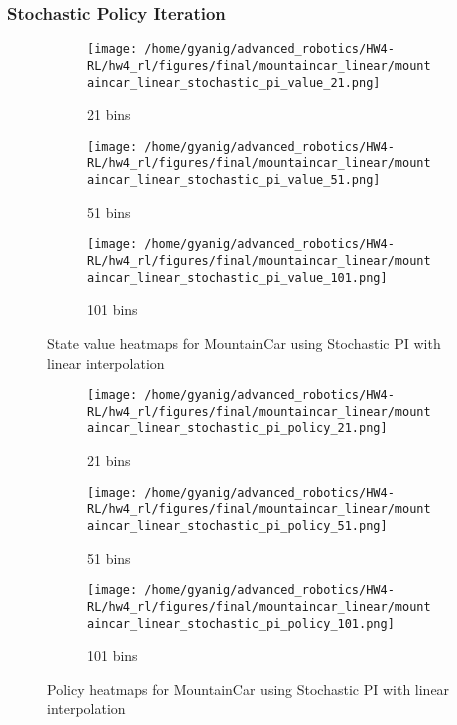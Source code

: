\documentclass{article}
\begin{document}
\subsubsection{Stochastic Policy Iteration}
\begin{figure}[H]
    \centering
    \begin{subfigure}{0.32\textwidth}
        \texttt{[image: /home/gyanig/advanced\_robotics/HW4-RL/hw4\_rl/figures/final/mountaincar\_linear/mountaincar\_linear\_stochastic\_pi\_value\_21.png]}
        \caption{21 bins}
    \end{subfigure}
    \begin{subfigure}{0.32\textwidth}
        \texttt{[image: /home/gyanig/advanced\_robotics/HW4-RL/hw4\_rl/figures/final/mountaincar\_linear/mountaincar\_linear\_stochastic\_pi\_value\_51.png]}
        \caption{51 bins}
    \end{subfigure}
    \begin{subfigure}{0.32\textwidth}
        \texttt{[image: /home/gyanig/advanced\_robotics/HW4-RL/hw4\_rl/figures/final/mountaincar\_linear/mountaincar\_linear\_stochastic\_pi\_value\_101.png]}
        \caption{101 bins}
    \end{subfigure}
    \caption{State value heatmaps for MountainCar using Stochastic PI with linear interpolation}
\end{figure}

\begin{figure}[H]
    \centering
    \begin{subfigure}{0.32\textwidth}
        \texttt{[image: /home/gyanig/advanced\_robotics/HW4-RL/hw4\_rl/figures/final/mountaincar\_linear/mountaincar\_linear\_stochastic\_pi\_policy\_21.png]}
        \caption{21 bins}
    \end{subfigure}
    \begin{subfigure}{0.32\textwidth}
        \texttt{[image: /home/gyanig/advanced\_robotics/HW4-RL/hw4\_rl/figures/final/mountaincar\_linear/mountaincar\_linear\_stochastic\_pi\_policy\_51.png]}
        \caption{51 bins}
    \end{subfigure}
    \begin{subfigure}{0.32\textwidth}
        \texttt{[image: /home/gyanig/advanced\_robotics/HW4-RL/hw4\_rl/figures/final/mountaincar\_linear/mountaincar\_linear\_stochastic\_pi\_policy\_101.png]}
        \caption{101 bins}
    \end{subfigure}
    \caption{Policy heatmaps for MountainCar using Stochastic PI with linear interpolation}
\end{figure}
\end{document}
